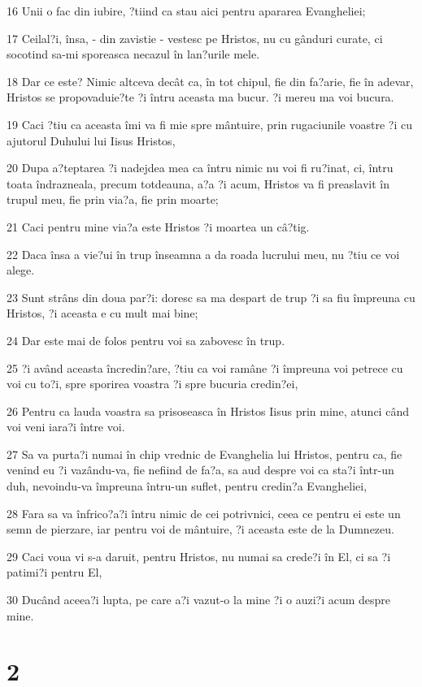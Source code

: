 \par 16 Unii o fac din iubire, ?tiind ca stau aici pentru apararea Evangheliei;
\par 17 Ceilal?i, însa, - din zavistie - vestesc pe Hristos, nu cu gânduri curate, ci socotind sa-mi sporeasca necazul în lan?urile mele.
\par 18 Dar ce este? Nimic altceva decât ca, în tot chipul, fie din fa?arie, fie în adevar, Hristos se propovaduie?te ?i întru aceasta ma bucur. ?i mereu ma voi bucura.
\par 19 Caci ?tiu ca aceasta îmi va fi mie spre mântuire, prin rugaciunile voastre ?i cu ajutorul Duhului lui Iisus Hristos,
\par 20 Dupa a?teptarea ?i nadejdea mea ca întru nimic nu voi fi ru?inat, ci, întru toata îndrazneala, precum totdeauna, a?a ?i acum, Hristos va fi preaslavit în trupul meu, fie prin via?a, fie prin moarte;
\par 21 Caci pentru mine via?a este Hristos ?i moartea un câ?tig.
\par 22 Daca însa a vie?ui în trup înseamna a da roada lucrului meu, nu ?tiu ce voi alege.
\par 23 Sunt strâns din doua par?i: doresc sa ma despart de trup ?i sa fiu împreuna cu Hristos, ?i aceasta e cu mult mai bine;
\par 24 Dar este mai de folos pentru voi sa zabovesc în trup.
\par 25 ?i având aceasta încredin?are, ?tiu ca voi ramâne ?i împreuna voi petrece cu voi cu to?i, spre sporirea voastra ?i spre bucuria credin?ei,
\par 26 Pentru ca lauda voastra sa prisoseasca în Hristos Iisus prin mine, atunci când voi veni iara?i între voi.
\par 27 Sa va purta?i numai în chip vrednic de Evanghelia lui Hristos, pentru ca, fie venind eu ?i vazându-va, fie nefiind de fa?a, sa aud despre voi ca sta?i într-un duh, nevoindu-va împreuna întru-un suflet, pentru credin?a Evangheliei,
\par 28 Fara sa va înfrico?a?i întru nimic de cei potrivnici, ceea ce pentru ei este un semn de pierzare, iar pentru voi de mântuire, ?i aceasta este de la Dumnezeu.
\par 29 Caci voua vi s-a daruit, pentru Hristos, nu numai sa crede?i în El, ci sa ?i patimi?i pentru El,
\par 30 Ducând aceea?i lupta, pe care a?i vazut-o la mine ?i o auzi?i acum despre mine.

\chapter{2}

